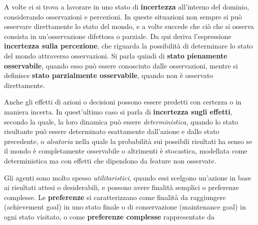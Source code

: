 \documentclass[a4paper]{extarticle}
\begin{document}
A volte ci si trova a lavorare in uno stato di \textbf{incertezza} all'interno del dominio, considerando osservazioni e percezioni. In queste situazioni non sempre si può osservare direttamente lo stato del mondo, e a volte succede che ciò che si osserva consista in un'osservazione difettosa o parziale. Da qui deriva l'espressione \textbf{incertezza sulla percezione}, che riguarda la possibilità di determinare lo stato del mondo attraverso osservazioni. Si parla quindi di \textbf{stato pienamente osservabile}, quando esso può essere conosciuto dalle osservazioni, mentre si definisce \textbf{stato parzialmente osservabile}, quando non è osservato direttamente.

Anche gli effetti di azioni o decisioni possono essere predetti con certezza o in maniera incerta. In quest'ultimo caso si parla di \textbf{incertezza sugli effetti}, secondo la quale, la loro dinamica può essere \textit{deterministica}, quando lo stato risultante può essere determinato esattamente dall'azione e dallo stato precedente, o \textit{aleatoria} nella quale la probabilità sui possibili risultati ha senso se il mondo è completamente osservabile o altrimenti è stocastica, modellata come deterministica ma con effetti che dipendono da feature non osservate.

Gli agenti sono molto spesso \textit{utilitaristici}, quando essi scelgono un'azione in base ai risultati attesi o desiderabili, e possono avere finalità semplici o preferenze complesse. Le \textbf{preferenze} si caratterizzano come finalità da raggiungere (achievement goal) in uno stato finale o di conservazione (maintenance goal) in ogni stato visitato,  o come \textbf{preferenze complesse} rappresentate da 
\end{document}
